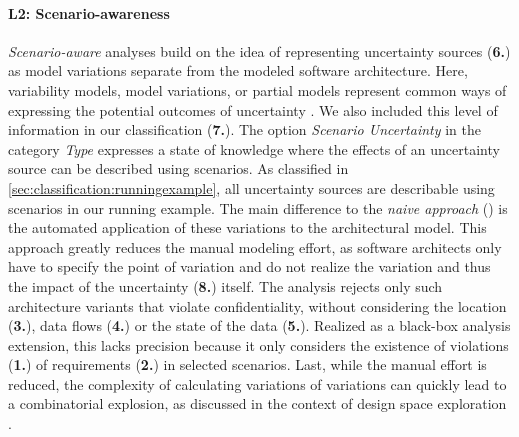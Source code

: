 \paragraph{L2: Scenario-awareness}\label{awarenesslevel:2}
\emph{Scenario-aware} analyses build on the idea of representing uncertainty sources (\textbf{6.}) as model variations separate from the modeled software architecture.
Here, variability models, model variations, or partial models represent common ways of expressing the potential outcomes of uncertainty \cite{troya_uncertainty_2021}.
We also included this level of information in our classification (\textbf{7.}).
The option \emph{Scenario Uncertainty} in the category \emph{Type} expresses a state of knowledge where the effects of an uncertainty source can be described using scenarios.
As classified in \autoref{sec:classification:runningexample}, all uncertainty sources are describable using scenarios in our running example.
The main difference to the \emph{naive approach} () is the automated application of these variations to the architectural model.
This approach greatly reduces the manual modeling effort, as software architects only have to specify the point of variation and do not realize the variation and thus the impact of the uncertainty (\textbf{8.}) itself.
The analysis rejects only such architecture variants that violate confidentiality, without considering the location (\textbf{3.}), data flows (\textbf{4.}) or the state of the data (\textbf{5.}).
Realized as a black-box analysis extension, this lacks precision because it only considers the existence of violations (\textbf{1.}) of requirements (\textbf{2.}) in selected scenarios.
Last, while the manual effort is reduced, the complexity of calculating variations of variations can quickly lead to a combinatorial explosion, as discussed in the context of design space exploration \cite{koziolek_automated_2011}.



